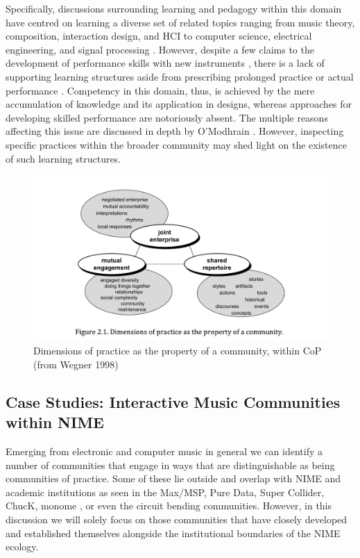 Specifically, discussions surrounding learning and pedagogy within this domain have centred on learning a diverse set of related topics ranging from music theory, composition, interaction design, and HCI to computer science, electrical engineering, and signal processing \cite{Cook:2009,DArcangelo:2002,Fels:2009,Leeuw:2012,Magnusson:2009a}. However, despite a few claims to the development of performance skills with new instruments \cite{Leeuw:2012}, there is a lack of supporting learning structures aside from prescribing prolonged practice or actual performance \cite{Butler:2008,Oore:2005,Zbyszynski:2008}. Competency in this domain, thus, is achieved by the mere accumulation of knowledge and its application in designs, whereas approaches for developing skilled performance are notoriously absent. The multiple reasons affecting this issue are discussed in depth by O'Modhrain \cite{OModhrain:2011}. However, inspecting specific practices within the broader community may shed light on the existence of such learning structures. 

\begin{figure}[t]
	\centering
		\includegraphics[width=1\columnwidth]{Wenger_1998_CoP.pdf}
	\caption{Dimensions of practice as the property of a community, within CoP (from Wegner 1998)}
	\label{Marquez-Borbon:fig:CoP}
\end{figure}


\subsection{Case Studies: Interactive Music Communities within NIME}
Emerging from electronic and computer music in general we can identify a number of communities that engage in ways that are distinguishable as being communities of practice. Some of these lie outside and overlap with NIME and academic institutions as seen in the Max/MSP, Pure Data, Super Collider, ChucK, monome \cite{Vallis:2011}, or even the circuit bending communities. However, in this discussion we will solely focus on those communities that have closely developed and established themselves alongside the institutional boundaries of the NIME ecology.  

